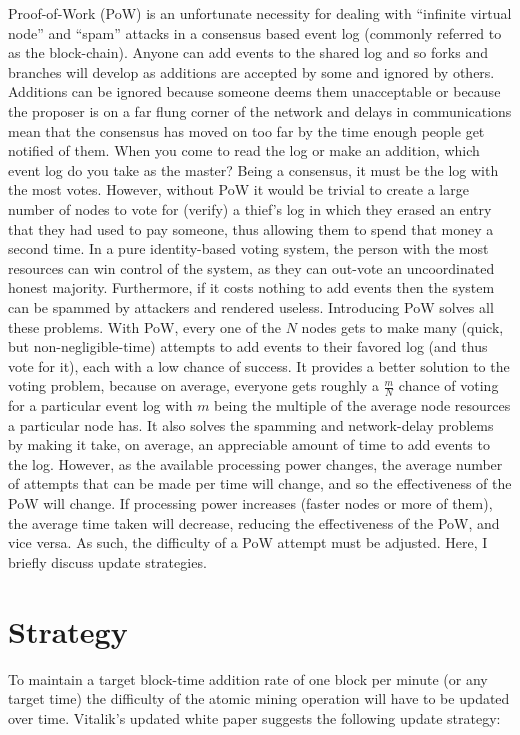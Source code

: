 \documentclass[10pt,a4paper]{article}
\begin{document}
Proof-of-Work (PoW) is an unfortunate necessity for dealing with ``infinite virtual node'' and ``spam'' attacks in a consensus based event log (commonly referred to as the block-chain). Anyone can add events to the shared log and so forks and branches will develop as additions are accepted by some and ignored by others. Additions can be ignored because someone deems them unacceptable or because the proposer is on a far flung corner of the network and delays in communications mean that the consensus has moved on too far by the time enough people get notified of them. When you come to read the log or make an addition, which event log do you take as the master? Being a consensus, it must be the log with the most votes. However, without PoW it would be trivial to create a large number of nodes to vote for (verify) a thief's log in which they erased an entry that they had used to pay someone, thus allowing them to spend that money a second time. In a pure identity-based voting system, the person with the most resources can win control of the system, as they can out-vote an uncoordinated honest majority. Furthermore, if it costs nothing to add events then the system can be spammed by attackers and rendered useless. Introducing PoW solves all these problems. With PoW, every one of the $N$ nodes gets to make many (quick, but non-negligible-time) attempts to add events to their favored log (and thus vote for it), each with a low chance of success. It provides a better solution to the voting problem, because on average, everyone gets roughly a $\frac{m}{N}$ chance of voting for a particular event log with $m$ being the multiple of the average node resources a particular node has. It also solves the spamming and network-delay problems by making it take, on average, an appreciable amount of time to add events to the log. However, as the available processing power changes, the average number of attempts that can be made per time will change, and so the effectiveness of the PoW will change. If processing power increases (faster nodes or more of them), the average time taken will decrease, reducing the effectiveness of the PoW, and vice versa. As such, the difficulty of a PoW attempt must be adjusted. Here, I briefly discuss update strategies.

\newpage

\section*{Strategy}

To maintain a target block-time addition rate of one block per minute (or any target time) the difficulty of the atomic mining operation will have to be updated over time. Vitalik's updated white paper suggests the following update strategy:
\end{document}
